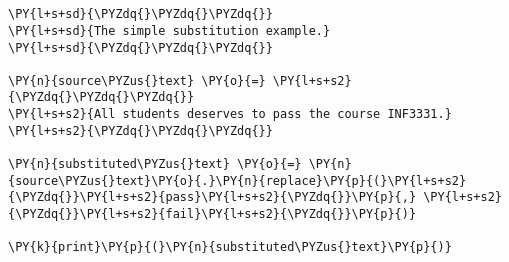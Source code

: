 

\section*{}

\begin{Verbatim}[commandchars=\\\{\}]
\PY{l+s+sd}{\PYZdq{}\PYZdq{}\PYZdq{}}
\PY{l+s+sd}{The simple substitution example.}
\PY{l+s+sd}{\PYZdq{}\PYZdq{}\PYZdq{}}

\PY{n}{source\PYZus{}text} \PY{o}{=} \PY{l+s+s2}{\PYZdq{}\PYZdq{}\PYZdq{}}
\PY{l+s+s2}{All students deserves to pass the course INF3331.}
\PY{l+s+s2}{\PYZdq{}\PYZdq{}\PYZdq{}}

\PY{n}{substituted\PYZus{}text} \PY{o}{=} \PY{n}{source\PYZus{}text}\PY{o}{.}\PY{n}{replace}\PY{p}{(}\PY{l+s+s2}{\PYZdq{}}\PY{l+s+s2}{pass}\PY{l+s+s2}{\PYZdq{}}\PY{p}{,} \PY{l+s+s2}{\PYZdq{}}\PY{l+s+s2}{fail}\PY{l+s+s2}{\PYZdq{}}\PY{p}{)}

\PY{k}{print}\PY{p}{(}\PY{n}{substituted\PYZus{}text}\PY{p}{)}
\end{Verbatim}
